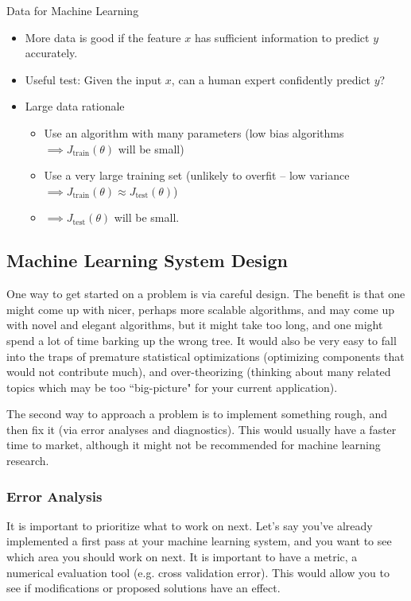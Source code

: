 \documentclass[letterpaper,10pt]{article}
\begin{document}
Data for Machine Learning
	\begin{itemize}
	\item More data is good if the feature $x$ has sufficient information to predict $y$ accurately.
	\item Useful test: Given the input $x$, can a human expert confidently predict $y$?
	\item Large data rationale
		\begin{itemize}
		\item Use an algorithm with many parameters (low bias algorithms $\implies J_\text{train}(\theta)$ will be small)
		\item Use a very large training set (unlikely to overfit -- low variance $\implies J_\text{train} (\theta) \approx J_\text{test} (\theta)$)
		\item $\implies J_\text{test} (\theta)$ will be small.
		\end{itemize}
	\end{itemize}



\subsection{Machine Learning System Design}

One way to get started on a problem is via careful design. The benefit is that one might come up with nicer, perhaps more scalable algorithms, and may come up with novel and elegant algorithms, but it might take too long, and one might spend a lot of time barking up the wrong tree. It would also be very easy to fall into the traps of premature statistical optimizations (optimizing components that would not contribute much), and over-theorizing (thinking about many related topics which may be too ``big-picture" for your current application).

The second way to approach a problem is to implement something rough, and then fix it (via error analyses and diagnostics). This would usually have a faster time to market, although it might not be recommended for machine learning research.

\subsubsection{Error Analysis}

It is important to prioritize what to work on next. Let's say you've already implemented a first pass at your machine learning system, and you want to see which area you should work on next. It is important to have a metric, a numerical evaluation tool (e.g. cross validation error). This would allow you to see if modifications or proposed solutions have an effect.
\end{document}
